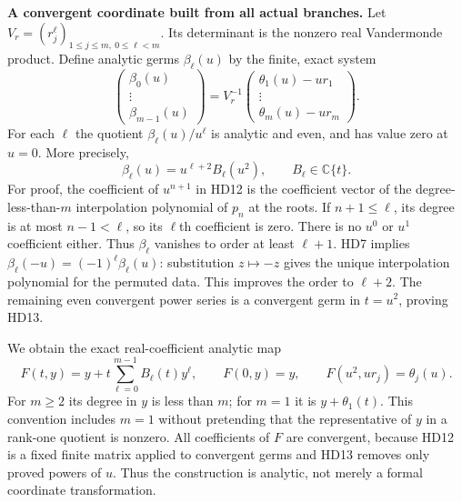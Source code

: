 \documentclass[11pt,a4paper]{article}
\theoremstyle{definition}\newtheorem{definition}[theorem]{Definition}
\begin{document}
\HD\textbf{A convergent coordinate built from all actual branches.}
Let $V_r=(r_j^\ell)_{1\le j\le m,\ 0\le\ell<m}$.
Its determinant is the nonzero real Vandermonde product.
Define analytic germs $\beta_\ell(u)$ by the finite, exact system
\[
 \begin{pmatrix}\beta_0(u)\\ \vdots\\ \beta_{m-1}(u)\end{pmatrix}
       =V_r^{-1}
          \begin{pmatrix}\theta_1(u)-ur_1\\
                          \vdots\\\theta_m(u)-ur_m\end{pmatrix}.
 \tag{HD12}\label{hd:finiteinterp}
\]
For each $\ell$ the quotient $\beta_\ell(u)/u^\ell$ is analytic
and even, and has value zero at $u=0$. More precisely,
\[
 \beta_\ell(u)=u^{\ell+2}B_\ell(u^2),\qquad B_\ell\in\mathbb C\{t\}.
 \tag{HD13}\label{hd:divisibility}
\]
For proof, the coefficient of $u^{n+1}$ in HD12 is the coefficient
vector of the degree-less-than-$m$ interpolation polynomial of
$p_n$ at the roots. If $n+1\le\ell$, its degree is at most
$n-1<\ell$, so its $\ell$th coefficient is zero.
There is no $u^0$ or $u^1$ coefficient either.
Thus $\beta_\ell$ vanishes to order at least $\ell+1$.
HD7 implies $\beta_\ell(-u)=(-1)^\ell\beta_\ell(u)$:
substitution $z\mapsto-z$ gives the unique interpolation polynomial
for the permuted data. This improves the order to $\ell+2$.
The remaining even convergent power series is a convergent germ
in $t=u^2$, proving HD13.

We obtain the exact real-coefficient analytic map
\[
 F(t,y)=y+t\sum_{\ell=0}^{m-1}B_\ell(t)y^\ell,\qquad
 F(0,y)=y,\qquad
 F(u^2,ur_j)=\theta_j(u).
 \tag{HD14}\label{hd:F}
\]
For $m\ge2$ its degree in $y$ is less than $m$; for $m=1$ it is
$y+\theta_1(t)$. This convention includes $m=1$ without pretending
that the representative of $y$ in a rank-one quotient is nonzero.
All coefficients of $F$ are convergent, because HD12 is a fixed
finite matrix applied to convergent germs and HD13 removes only
proved powers of $u$. Thus the construction is analytic, not
merely a formal coordinate transformation.
\end{document}
